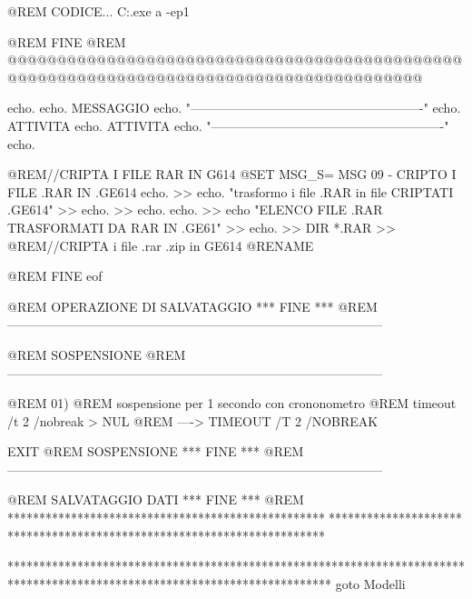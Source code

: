 \documentclass[10pt,a4paper]{book}
\begin{document}
{			@REM CODICE...
			C:\CASA\Rar.exe a -ep1 %
			
			
			@REM			FINE
			@REM @@@@@@@@@@@@@@@@@@@@@@@@@@@@@@@@@@@@@@@@@@@@@@@@@@@@@@@@@@@@@@@@@@@@@@@@@@@@@@@@@@@@@@@@
			
			
			
			
			
			
			echo.
			echo. MESSAGGIO %
			echo. "-------------------------------------------------------"	
			echo.	ATTIVITA									
			echo.	ATTIVITA									
			echo. "-------------------------------------------------------"	
			echo.										
			
			
			
			
			@REM//CRIPTA I FILE RAR IN G614
			@SET MSG_S= MSG 09 - CRIPTO I FILE .RAR IN .GE614
			echo. 								>> %
			echo. "trasformo i file .RAR in file CRIPTATI .GE614"		>> %
			echo.								>> %
			echo. %
			echo.								>> %
			echo "ELENCO FILE .RAR TRASFORMATI DA RAR IN .GE61"		>> %
			echo.								>> %
			DIR *.RAR							>> %
			@REM//CRIPTA i file .rar .zip in GE614
			@RENAME %
			
			
			@REM FINE 			eof
			
			@REM			OPERAZIONE DI SALVATAGGIO *** FINE ***
			@REM -----------------------------------------------------------------------------------------
			
			
			@REM			SOSPENSIONE
			@REM -----------------------------------------------------------------------------------------
			
			@REM 01)
			@REM sospensione per 1 secondo con crononometro 
			@REM timeout /t 2 /nobreak > NUL
			@REM ---->	TIMEOUT /T 2 /NOBREAK
			
			EXIT
			@REM			SOSPENSIONE *** FINE ***
			@REM -----------------------------------------------------------------------------------------
			
			
			@REM 			SALVATAGGIO DATI *** FINE ***
			@REM *************************************************************************************************************************
			
			
			
			
			
			***************************************************************************************************************************
			goto Modelli
			
}
\end{document}
